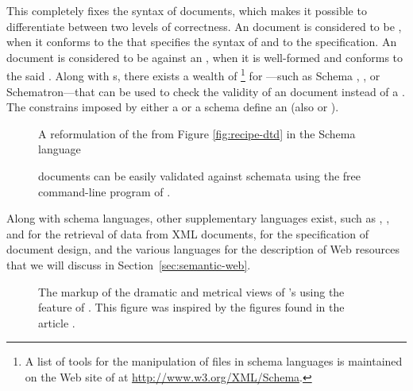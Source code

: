 This  completely fixes the syntax of  documents, which
makes it possible to differentiate between two levels of correctness. An
 document is considered to be %
, when it conforms to the  that
specifies the syntax of  and to the  specification.
An  document is considered to be
 against an , when it is
well-formed and conforms to the said . Along with s,
there exists a wealth of \footnote{
  A list of tools for the manipulation of files in  schema
  languages is maintained on the Web site of  at
  \url{http://www.w3.org/XML/Schema}.
} for ---such as   Schema%
, , or Schematron---that can be used
to check the validity of an  document instead of a .
The constrains imposed by either a  or a schema define an
 (also  or ).
 

\begin{figure}
  \caption{A reformulation of the  from Figure \ref{fig:recipe-dtd}
    in the  Schema 
    language}
  \label{fig:recipe-xsd}
\end{figure}

\begin{figure}
  \caption{ documents can be easily validated against 
    schemata using the free command-line program of .}
\end{figure}

Along with schema languages, other supplementary languages exist, such as
, , and  for the retrieval of data from XML
documents,  for the specification of  document
design, and the various languages for the description of Web resources that we
will discuss in Section~\ref{sec:semantic-web}.

\begin{figure}[!b]
  \caption{The markup of the dramatic and metrical views of 's  using the  feature of
    . This figure was inspired by the figures found in the article
    \protect{}.}
\end{figure}

